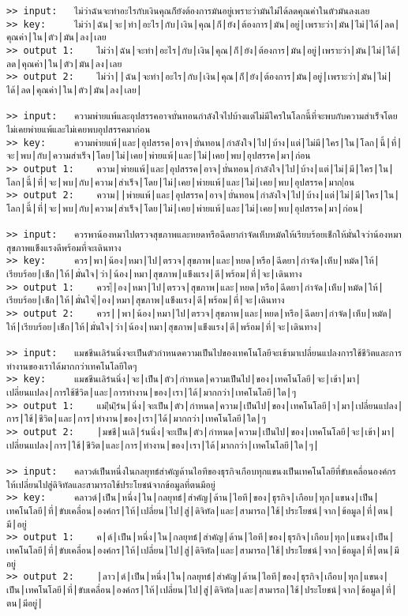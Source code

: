 \documentclass[11pt]{article}
\begin{document}
\begin{Verbatim}[commandchars=\\\{\}]
>> input:	ไม่ว่าฉันจะทำอะไรกับเงินคุณก็ยังต้องการมันอยู่เพราะว่ามันไม่ได้ลดคุณค่าในตัวมันลงเลย
>> key:		ไม่ว่า|ฉัน|จะ|ทำ|อะไร|กับ|เงิน|คุณ|ก็|ยัง|ต้องการ|มัน|อยู่|เพราะว่า|มัน|ไม่|ได้|ลด|คุณค่า|ใน|ตัว|มัน|ลง|เลย
>> output 1:	ไม่ว่า|ฉัน|จะทำ|อะไร|กับ|เงิน|คุณ|ก็|ยัง|ต้องการ|มัน|อยู่|เพราะว่า|มัน|ไม่|ได้|ลด|คุณค่า|ใน|ตัว|มัน|ลง|เลย
>> output 2:	ไม่ว่า||ฉัน|จะทำ|อะไร|กับ|เงิน|คุณ|ก็|ยัง|ต้องการ|มัน|อยู่|เพราะว่า|มัน|ไม่|ได้|ลด|คุณค่า|ใน|ตัว|มัน|ลง|เลย|

>> input:	ความพ่ายแพ้และอุปสรรคอาจบั่นทอนกำลังใจไปบ้างแต่ไม่มีใครในโลกนี้ที่จะพบกับความสำเร็จโดยไม่เคยพ่ายแพ้และไม่เคยพบอุปสรรคมาก่อน
>> key:		ความพ่ายแพ้|และ|อุปสรรค|อาจ|บั่นทอน|กำลังใจ|ไป|บ้าง|แต่|ไม่มี|ใคร|ใน|โลก|นี้|ที่|จะ|พบ|กับ|ความสำเร็จ|โดย|ไม่|เคย|พ่ายแพ้|และ|ไม่|เคย|พบ|อุปสรรค|มา|ก่อน
>> output 1:	ความ|พ่ายแพ้|และ|อุปสรรค|อาจ|บั่นทอน|กำลังใจ|ไป|บ้าง|แต่|ไม่|มี|ใคร|ใน|โลก|นี้|ที่|จะ|พบ|กับ|ความ|สำเร็จ|โดย|ไม่|เคย|พ่ายแพ้|และ|ไม่|เคย|พบ|อุปสรรค|มาก|่อน
>> output 2:	ความ||พ่ายแพ้|และ|อุปสรรค|อาจ|บั่นทอน|กำลังใจ|ไป|บ้าง|แต่|ไม่|มี|ใคร|ใน|โลก|นี้|ที่|จะ|พบ|กับ|ความ|สำเร็จ|โดย|ไม่|เคย|พ่ายแพ้|และ|ไม่|เคย|พบ|อุปสรรค|มา|ก่อน|

>> input:	ควรพาน้องหมาไปตรวจสุขภาพและหยดหรือฉีดยากำจัดเห็บหมัดให้เรียบร้อยเช็กให้มั่นใจว่าน้องหมาสุขภาพแข็งแรงดีพร้อมที่จะเดินทาง
>> key:		ควร|พา|น้อง|หมา|ไป|ตรวจ|สุขภาพ|และ|หยด|หรือ|ฉีดยา|กำจัด|เห็บ|หมัด|ให้|เรียบร้อย|เช็ก|ให้|มั่นใจ|ว่า|น้อง|หมา|สุขภาพ|แข็งแรง|ดี|พร้อม|ที่|จะ|เดินทาง
>> output 1:	ควร|้|อง|หมา|ไป|ตรวจ|สุขภาพ|และ|หยด|หรือ|ฉีดยา|กำจัด|เห็บ|หมัด|ให้|เรียบร้อย|เช็ก|ให้|มั่นใจ|้|อง|หมา|สุขภาพ|แข็งแรง|ดี|พร้อม|ที่|จะ|เดินทาง
>> output 2:	ควร||พา|น้อง|หมา|ไป|ตรวจ|สุขภาพ|และ|หยด|หรือ|ฉีดยา|กำจัด|เห็บ|หมัด|ให้|เรียบร้อย|เช็ก|ให้|มั่นใจ|ว่า|น้อง|หมา|สุขภาพ|แข็งแรง|ดี|พร้อม|ที่|จะ|เดินทาง|

>> input:	แมชชีนเลิร์นนิ่งจะเป็นตัวกำหนดความเป็นไปของเทคโนโลยีจะเข้ามาเปลี่ยนแปลงการใช้ชีวิตและการทำงานของเราได้มากกว่าเทคโนโลยีใดๆ
>> key:		แมชชีนเลิร์นนิ่ง|จะ|เป็น|ตัว|กำหนด|ความเป็นไป|ของ|เทคโนโลยี|จะ|เข้า|มา|เปลี่ยนแปลง|การใช้ชีวิต|และ|การทำงาน|ของ|เรา|ได้|มากกว่า|เทคโนโลยี|ใด|ๆ
>> output 1:	แม|ีน|ิร์น|นิ่ง|จะเป็น|ตัว|กำหนด|ความ|เป็นไป|ของ|เทคโนโลยี|า|มา|เปลี่ยนแปลง|การ|ใช้|ชีวิต|และ|การ|ทำงาน|ของ|เรา|ได้|มากกว่า|เทคโนโลยี|ใด|ๆ
>> output 2:	|มชชี|นเลิ|ร์นนิ่ง|จะเป็น|ตัว|กำหนด|ความ|เป็นไป|ของ|เทคโนโลยี|จะ|เข้า|มา|เปลี่ยนแปลง|การ|ใช้|ชีวิต|และ|การ|ทำงาน|ของ|เรา|ได้|มากกว่า|เทคโนโลยี|ใด|ๆ|

>> input:	คลาวด์เป็นหนึ่งในกลยุทธ์สำคัญด้านไอทีของธุรกิจเกือบทุกแขนงเป็นเทคโนโลยีที่ขับเคลื่อนองค์กรให้เปลี่ยนไปสู่ดิจิทัลและสามารถใช้ประโยชน์จากข้อมูลที่ตนมีอยู่
>> key:		คลาวด์|เป็น|หนึ่ง|ใน|กลยุทธ์|สำคัญ|ด้าน|ไอที|ของ|ธุรกิจ|เกือบ|ทุก|แขนง|เป็น|เทคโนโลยี|ที่|ขับเคลื่อน|องค์กร|ให้|เปลี่ยน|ไป|สู่|ดิจิทัล|และ|สามารถ|ใช้|ประโยชน์|จาก|ข้อมูล|ที่|ตน|มี|อยู่
>> output 1:	ค|ด์|เป็น|หนึ่ง|ใน|กลยุทธ์|สำคัญ|ด้าน|ไอที|ของ|ธุรกิจ|เกือบ|ทุก|แขนง|เป็น|เทคโนโลยี|ที่|ขับเคลื่อน|องค์กร|ให้|เปลี่ยน|ไป|สู่|ดิจิทัล|และ|สามารถ|ใช้|ประโยชน์|จาก|ข้อมูล|ที่|ตน|มีอยู่
>> output 2:	|ลาว|ด์|เป็น|หนึ่ง|ใน|กลยุทธ์|สำคัญ|ด้าน|ไอที|ของ|ธุรกิจ|เกือบ|ทุก|แขนง|เป็น|เทคโนโลยี|ที่|ขับเคลื่อน|องค์กร|ให้|เปลี่ยน|ไป|สู่|ดิจิทัล|และ|สามารถ|ใช้|ประโยชน์|จาก|ข้อมูล|ที่|ตน|มีอยู่|


\end{Verbatim}
\end{document}
